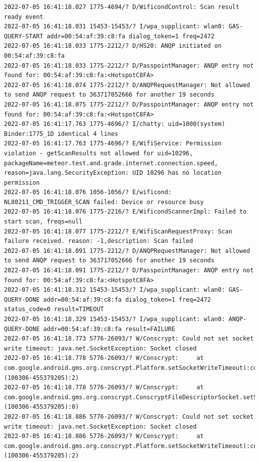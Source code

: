 \documentclass[a4paper,12pt]{book}
\begin{document}
\begin{lstlisting}
2022-07-05 16:41:18.027 1775-4694/? D/WificondControl: Scan result ready event
2022-07-05 16:41:18.031 15453-15453/? I/wpa_supplicant: wlan0: GAS-QUERY-START addr=00:54:af:39:c8:fa dialog_token=1 freq=2472
2022-07-05 16:41:18.033 1775-2212/? D/HS20: ANQP initiated on 00:54:af:39:c8:fa
2022-07-05 16:41:18.033 1775-2212/? D/PasspointManager: ANQP entry not found for: 00:54:af:39:c8:fa:<HotspotC8FA>
2022-07-05 16:41:18.074 1775-2212/? D/ANQPRequestManager: Not allowed to send ANQP request to 363717052666 for another 19 seconds
2022-07-05 16:41:18.075 1775-2212/? D/PasspointManager: ANQP entry not found for: 00:54:af:39:c8:fa:<HotspotC8FA>
2022-07-05 16:41:17.763 1775-4696/? I/chatty: uid=1000(system) Binder:1775_1D identical 4 lines
2022-07-05 16:41:17.763 1775-4696/? E/WifiService: Permission violation - getScanResults not allowed for uid=10296, packageName=meteor.test.and.grade.internet.connection.speed, reason=java.lang.SecurityException: UID 10296 has no location permission
2022-07-05 16:41:18.076 1056-1056/? E/wificond: NL80211_CMD_TRIGGER_SCAN failed: Device or resource busy
2022-07-05 16:41:18.076 1775-2216/? E/WificondScannerImpl: Failed to start scan, freqs=null
2022-07-05 16:41:18.077 1775-2212/? E/WifiScanRequestProxy: Scan failure received. reason: -1,description: Scan failed
2022-07-05 16:41:18.091 1775-2212/? D/ANQPRequestManager: Not allowed to send ANQP request to 363717052666 for another 19 seconds
2022-07-05 16:41:18.091 1775-2212/? D/PasspointManager: ANQP entry not found for: 00:54:af:39:c8:fa:<HotspotC8FA>
2022-07-05 16:41:18.312 15453-15453/? I/wpa_supplicant: wlan0: GAS-QUERY-DONE addr=00:54:af:39:c8:fa dialog_token=1 freq=2472 status_code=0 result=TIMEOUT
2022-07-05 16:41:18.329 15453-15453/? I/wpa_supplicant: wlan0: ANQP-QUERY-DONE addr=00:54:af:39:c8:fa result=FAILURE
2022-07-05 16:41:18.773 5776-26093/? W/Conscrypt: Could not set socket write timeout: java.net.SocketException: Socket closed
2022-07-05 16:41:18.778 5776-26093/? W/Conscrypt:     at com.google.android.gms.org.conscrypt.Platform.setSocketWriteTimeout(:com.google.android.gms@222413026@22.24.13 (100306-455379205):2)
2022-07-05 16:41:18.778 5776-26093/? W/Conscrypt:     at com.google.android.gms.org.conscrypt.ConscryptFileDescriptorSocket.setSoWriteTimeout(:com.google.android.gms@222413026@22.24.13 (100306-455379205):0)
2022-07-05 16:41:18.886 5776-26093/? W/Conscrypt: Could not set socket write timeout: java.net.SocketException: Socket closed
2022-07-05 16:41:18.886 5776-26093/? W/Conscrypt:     at com.google.android.gms.org.conscrypt.Platform.setSocketWriteTimeout(:com.google.android.gms@222413026@22.24.13 (100306-455379205):2)

\end{lstlisting}
\end{document}
